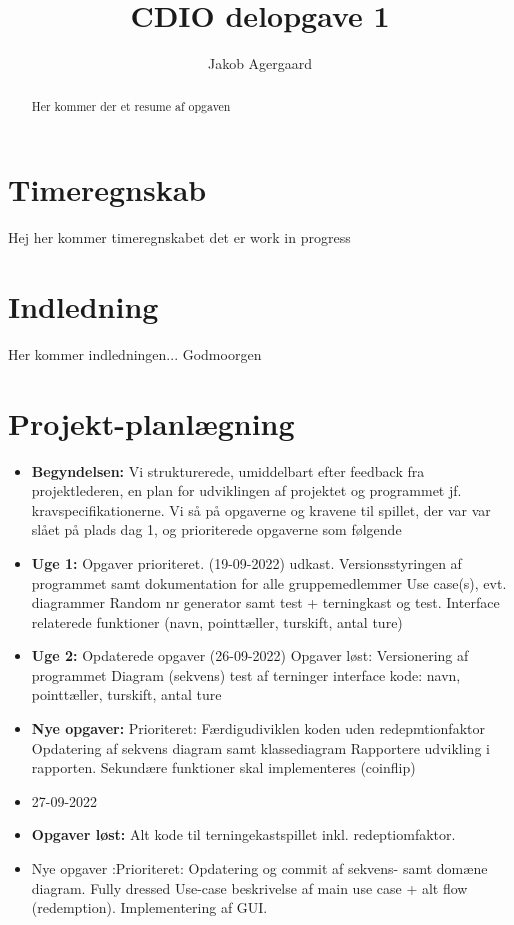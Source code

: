 \documentclass{article}
\title{CDIO delopgave 1}
\author{Jakob Agergaard}
\begin{document}


\normalsize
\begin{abstract}
     Her kommer der et resume af opgaven
\end{abstract}

\tableofcontents

\section{Timeregnskab}
Hej her kommer timeregnskabet det er work in progress

\section{Indledning}

Her kommer indledningen...
Godmoorgen

\section{Projekt-planlægning}
\begin {itemize}
\item [\textbf{Begyndelsen:}]Vi strukturerede, umiddelbart efter feedback fra projektlederen, en plan for udviklingen af projektet og programmet jf. kravspecifikationerne. Vi så på opgaverne og kravene til spillet, der var var slået på plads dag 1, og prioriterede opgaverne som følgende
 \item [\textbf{Uge 1:}]
 Opgaver prioriteret. (19-09-2022) udkast.
Versionsstyringen af programmet samt dokumentation for alle gruppemedlemmer
Use case(s), evt. diagrammer
Random nr generator samt test + terningkast og test.
Interface relaterede funktioner (navn, pointtæller, turskift, antal ture)
\item [\textbf{Uge 2:}]
Opdaterede opgaver (26-09-2022)
Opgaver løst:
Versionering af programmet
Diagram (sekvens)
test af terninger
interface kode: navn, pointtæller, turskift, antal ture
\item [\textbf{Nye opgaver:}]
Prioriteret:
Færdigudiviklen koden uden redepmtionfaktor
Opdatering af sekvens diagram samt klassediagram
Rapportere udvikling i rapporten.
Sekundære funktioner skal implementeres (coinflip)
\item 27-09-2022
\item [\textbf{Opgaver løst:}] Alt kode til terningekastspillet inkl. redeptiomfaktor.
\item [Nye opgaver]:Prioriteret: Opdatering og commit af sekvens- samt domæne diagram. Fully dressed Use-case beskrivelse af main use case + alt flow (redemption). Implementering af GUI.
\end {itemize}
\end{document}
